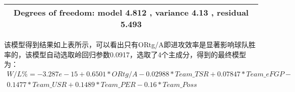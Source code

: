 \begin{enumerate}
\begin{table}[h]
\begin{tabular}{|c|c|c|c|c|c|}
		     \hline
		     \multicolumn{6}{|c|}{Degrees of freedom: model 4.812 , variance 4.13 , residual 5.493}\\
		     \hline
	\end{tabular}
\centering
\end{table}
该模型得到结果如上表所示，可以看出只有ORtg/A即进攻效率是显著影响球队胜率的，该模型自动选取岭回归参数0.0917，选取了4个主成分，得到的最终模型为：
\begin{multline}
W/L\% =-3.287e-15+ 0.6501*ORtg/A-0.02988*Team\_TSR+0.07847*Team\_eFGP-\\0.1477*Team\_USR+0.1489*Team\_PER-0.16*Team\_Poss
\end{multline}


\end{enumerate}






  


